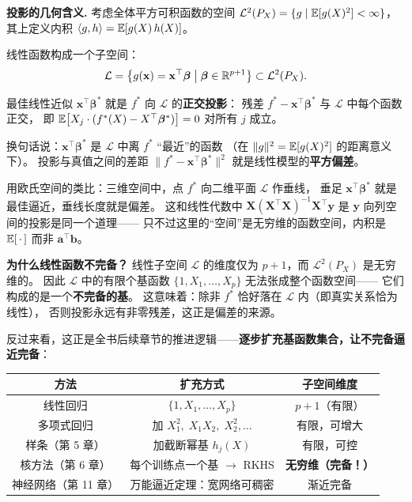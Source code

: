 \textbf{投影的几何含义.}
考虑全体平方可积函数的空间 $\mathcal{L}^2(P_X) = \{g \mid \mathbb{E}[g(X)^2] < \infty\}$，
其上定义内积 $\langle g, h \rangle = \mathbb{E}[g(X)\,h(X)]$。

线性函数构成一个子空间：
\[
\mathcal{L} = \big\{ g(\mathbf{x}) = \mathbf{x}^\top \bm{\beta} \;\big|\; \bm{\beta} \in \mathbb{R}^{p+1} \big\} \subset \mathcal{L}^2(P_X).
\]

最佳线性近似 $\mathbf{x}^\top \bm{\beta}^*$ 就是 $f^*$ 向 $\mathcal{L}$ 的\textbf{正交投影}：
残差 $f^* - \mathbf{x}^\top \bm{\beta}^*$ 与 $\mathcal{L}$ 中每个函数正交，
即 $\mathbb{E}\big[X_j \cdot (f^*(X) - X^\top \bm{\beta}^*)\big] = 0$ 对所有 $j$ 成立。

换句话说：$\mathbf{x}^\top \bm{\beta}^*$ 是 $\mathcal{L}$ 中离 $f^*$ ``最近''的函数
（在 $\|g\|^2 = \mathbb{E}[g(X)^2]$ 的距离意义下）。
投影与真值之间的差距 $\|f^* - \mathbf{x}^\top \bm{\beta}^*\|^2$ 就是线性模型的\textbf{平方偏差}。

用欧氏空间的类比：三维空间中，点 $f^*$ 向二维平面 $\mathcal{L}$ 作垂线，
垂足 $\mathbf{x}^\top \bm{\beta}^*$ 就是最佳逼近，垂线长度就是偏差。
这和线性代数中 $\mathbf{X}(\mathbf{X}^\top\mathbf{X})^{-1}\mathbf{X}^\top \mathbf{y}$ 是 $\mathbf{y}$ 向列空间的投影是同一个道理——
只不过这里的``空间''是无穷维的函数空间，内积是 $\mathbb{E}[\,\cdot\,]$ 而非 $\mathbf{a}^\top \mathbf{b}$。

\textbf{为什么线性函数不完备？}
线性子空间 $\mathcal{L}$ 的维度仅为 $p+1$，而 $\mathcal{L}^2(P_X)$ 是无穷维的。
因此 $\mathcal{L}$ 中的有限个基函数 $\{1, X_1, \dots, X_p\}$ 无法张成整个函数空间——
它们构成的是一个\textbf{不完备的基}。
这意味着：除非 $f^*$ 恰好落在 $\mathcal{L}$ 内（即真实关系恰为线性），
否则投影永远有非零残差，这正是偏差的来源。

反过来看，这正是全书后续章节的推进逻辑——\textbf{逐步扩充基函数集合，让不完备逼近完备}：

\begin{center}
\renewcommand{\arraystretch}{1.5}
\begin{tabular}{c|c|c}
\toprule
\textbf{方法} & \textbf{扩充方式} & \textbf{子空间维度} \\
\midrule
线性回归 & $\{1, X_1, \dots, X_p\}$ & $p+1$（有限） \\
多项式回归 & 加 $X_1^2,\; X_1 X_2,\; X_2^2, \dots$ & 有限，可增大 \\
样条（第 5 章） & 加截断幂基 $h_j(X)$ & 有限，可控 \\
核方法（第 6 章） & 每个训练点一个基 $\to$ RKHS & \textbf{无穷维（完备！）} \\
神经网络（第 11 章） & 万能逼近定理：宽网络可稠密 & 渐近完备 \\
\bottomrule
\end{tabular}
\end{center}

